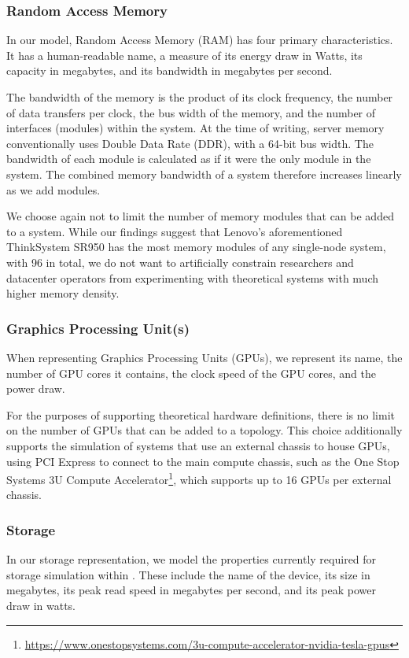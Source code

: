 \documentclass[11pt]{article}
\begin{document}
		\subsubsection{Random Access Memory}
			In our model, Random Access Memory (RAM) has four primary characteristics.
			It has a human-readable name, a measure of its energy draw in Watts, its capacity in megabytes, and its bandwidth in megabytes per second.
			
			The bandwidth of the memory is the product of its clock frequency, the number of data transfers per clock, the bus width of the memory, and the number of interfaces (modules) within the system.
			At the time of writing, server memory conventionally uses Double Data Rate (DDR), with a 64-bit bus width.
			The bandwidth of each module is calculated as if it were the only module in the system.
			The combined memory bandwidth of a system therefore increases linearly as we add modules.
			
			We choose again not to limit the number of memory modules that can be added to a system.
			While our findings suggest that Lenovo's aforementioned ThinkSystem SR950 has the most memory modules of any single-node system, with 96 in total, we do not want to artificially constrain researchers and datacenter operators from experimenting with theoretical systems with much higher memory density.

		\subsubsection{Graphics Processing Unit(s)}
			When representing Graphics Processing Units (GPUs), we represent its name, the number of GPU cores it contains, the clock speed of the GPU cores, and the power draw.

			For the purposes of supporting theoretical hardware definitions, there is no limit on the number of GPUs that can be added to a topology. 
			This choice additionally supports the simulation of systems that use an external chassis to house GPUs, using PCI Express to connect to the main compute chassis, such as the One Stop Systems 3U Compute Accelerator\footnote{\url{https://www.onestopsystems.com/3u-compute-accelerator-nvidia-tesla-gpus}}, which supports up to 16 GPUs per external chassis. 

		\subsubsection{Storage}
			In our storage representation, we model the properties currently required for storage simulation within \opendc{}.
			These include the name of the device, its size in megabytes, its peak read speed in megabytes per second, and its peak power draw in watts.
			
\end{document}

